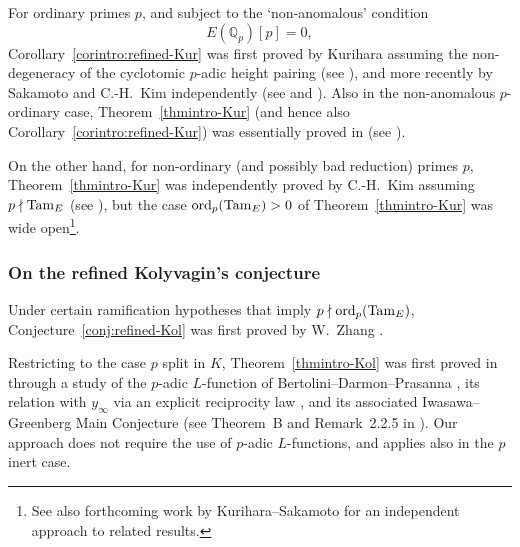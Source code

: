\documentclass[10pt,reqno]{amsart}
\numberwithin{equation}{section}
\theoremstyle{plain}
\theoremstyle{definition}
\theoremstyle{definition}
\theoremstyle{plain}
\theoremstyle{plain}
\theoremstyle{plain}
\theoremstyle{plain}
\theoremstyle{plain}
\theoremstyle{plain}
\newcommand{\Q}{\mathbb{Q}}
\begin{document}
For ordinary primes $p$, and subject to the `non-anomalous' condition %
\begin{equation}\label{eq:nonanom}
E(\Q_p)[p]=0,\tag{nonanom}
\end{equation}
Corollary~\ref{corintro:refined-Kur} was first proved by Kurihara %
assuming the non-degeneracy of the cyclotomic $p$-adic height pairing  (see \cite[Thm.~10.8]{kurihara-munster}), and more recently by Sakamoto and C.-H.~Kim independently (see \cite[Thm.~1.2]{sakamoto-docmath} and \cite[Thm.~1.10]{kim}). Also in the non-anomalous $p$-ordinary case, Theorem~\ref{thmintro-Kur} (and hence also Corollary~\ref{corintro:refined-Kur}) was essentially proved in \cite{BCGS} (see \cite[Rem.~3.3.5]{BCGS}). 

On the other hand, for non-ordinary (and possibly bad reduction) primes $p$,  Theorem~\ref{thmintro-Kur} was independently proved by C.-H.~Kim assuming $p\nmid{\rm Tam}_E$ (see \cite[Thm.~1.10]{kim}), but the case ${\rm ord}_p({\rm Tam}_E)>0$ of Theorem~\ref{thmintro-Kur} was wide open\footnote{See also forthcoming work by Kurihara--Sakamoto \cite{kurihara-sakamoto} for an independent approach to related results.}.

\subsubsection{On the refined Kolyvagin's conjecture} 

Under certain ramification hypotheses that imply $p\nmid {\rm ord}_p({\rm Tam}_E)$, Conjecture~\ref{conj:refined-Kol} was first proved by W.~Zhang \cite{zhang_ind}. 

Restricting to the case $p$ split in $K$, Theorem~\ref{thmintro-Kol} was first proved in \cite{BCGS} through a study of the $p$-adic $L$-function of Bertolini--Darmon--Prasanna \cite{BDP}, its relation with $y_\infty$ via an explicit reciprocity law \cite{cas-hsieh1}, and its associated Iwasawa--Greenberg Main Conjecture (see Theorem~B and Remark~2.2.5 in \cite{BCGS}). %
Our approach does not require the use of $p$-adic $L$-functions, and applies also in the $p$ inert case. 
\end{document}
